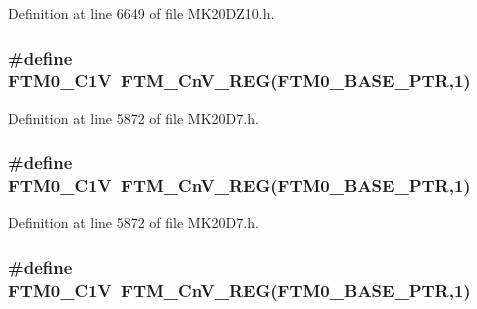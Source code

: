 Definition at line 6649 of file M\+K20\+D\+Z10.\+h.

\subsubsection[{\texorpdfstring{F\+T\+M0\+\_\+\+C1V}{FTM0_C1V}}]{\setlength{\rightskip}{0pt plus 5cm}\#define F\+T\+M0\+\_\+\+C1V~{\bf F\+T\+M\+\_\+\+Cn\+V\+\_\+\+R\+EG}({\bf F\+T\+M0\+\_\+\+B\+A\+S\+E\+\_\+\+P\+TR},1)}\hypertarget{group___f_t_m___register___accessor___macros_ga1f892dedc1f6cec1bf35a557c7939907}{}\label{group___f_t_m___register___accessor___macros_ga1f892dedc1f6cec1bf35a557c7939907}


Definition at line 5872 of file M\+K20\+D7.\+h.

\subsubsection[{\texorpdfstring{F\+T\+M0\+\_\+\+C1V}{FTM0_C1V}}]{\setlength{\rightskip}{0pt plus 5cm}\#define F\+T\+M0\+\_\+\+C1V~{\bf F\+T\+M\+\_\+\+Cn\+V\+\_\+\+R\+EG}({\bf F\+T\+M0\+\_\+\+B\+A\+S\+E\+\_\+\+P\+TR},1)}\hypertarget{group___f_t_m___register___accessor___macros_ga1f892dedc1f6cec1bf35a557c7939907}{}\label{group___f_t_m___register___accessor___macros_ga1f892dedc1f6cec1bf35a557c7939907}


Definition at line 5872 of file M\+K20\+D7.\+h.

\subsubsection[{\texorpdfstring{F\+T\+M0\+\_\+\+C1V}{FTM0_C1V}}]{\setlength{\rightskip}{0pt plus 5cm}\#define F\+T\+M0\+\_\+\+C1V~{\bf F\+T\+M\+\_\+\+Cn\+V\+\_\+\+R\+EG}({\bf F\+T\+M0\+\_\+\+B\+A\+S\+E\+\_\+\+P\+TR},1)}\hypertarget{group___f_t_m___register___accessor___macros_ga1f892dedc1f6cec1bf35a557c7939907}{}\label{group___f_t_m___register___accessor___macros_ga1f892dedc1f6cec1bf35a557c7939907}


